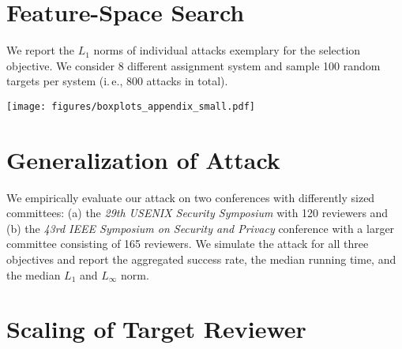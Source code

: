\documentclass[letterpaper,twocolumn,10pt]{article}
\begin{document}
\section{Feature-Space Search}
\label{app:boxplots}
\vspace{-0.5em}

We report the $L_1$ norms of individual attacks exemplary for the selection objective. We consider 8 different assignment system and sample 100 random targets per system (i.\,e., 800 attacks in total).\smallskip

\vspace{-1em}
\begin{center}
\texttt{[image: figures/boxplots\_appendix\_small.pdf]}  
\end{center}

\section{Generalization of Attack}
\label{app:generalizaton}
\vspace{-0.5em}

We empirically evaluate our attack on two conferences with differently sized committees: (a) the \emph{29th USENIX Security Symposium} with 120 reviewers and (b) the \emph{43rd IEEE Symposium on Security and Privacy} conference with a larger committee consisting of 165 reviewers. We simulate the attack for all three objectives and report the aggregated success rate, the median running time, and the median $L_1$ and $L_\infty$ norm.

\vspace{-1em}
\begin{center}
\end{center}

\section{Scaling of Target Reviewer}
\label{app:scaling}
\vspace{-0.5em}
\end{document}
